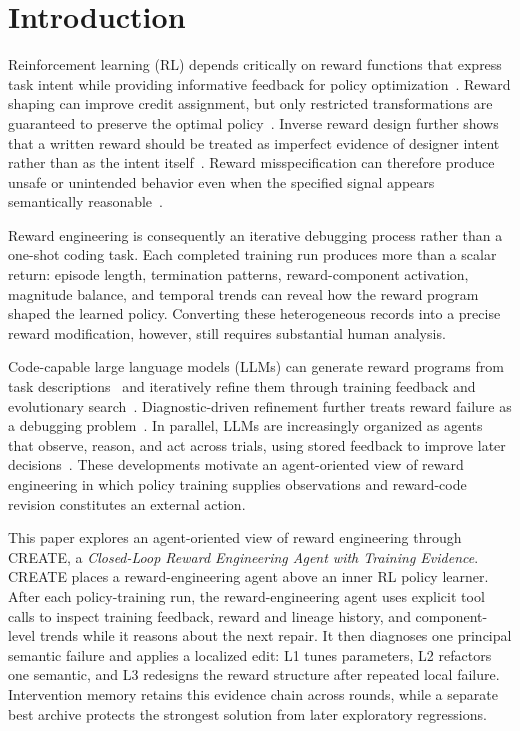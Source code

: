 \section{Introduction}

Reinforcement learning (RL) depends critically on reward functions that express task intent while providing informative feedback for policy optimization~\cite{sutton2018rl}. Reward shaping can improve credit assignment, but only restricted transformations are guaranteed to preserve the optimal policy~\cite{ng1999policy}. Inverse reward design further shows that a written reward should be treated as imperfect evidence of designer intent rather than as the intent itself~\cite{hadfield2017inverse}. Reward misspecification can therefore produce unsafe or unintended behavior even when the specified signal appears semantically reasonable~\cite{amodei2016concrete}.

Reward engineering is consequently an iterative debugging process rather than a one-shot coding task. Each completed training run produces more than a scalar return: episode length, termination patterns, reward-component activation, magnitude balance, and temporal trends can reveal how the reward program shaped the learned policy. Converting these heterogeneous records into a precise reward modification, however, still requires substantial human analysis.

Code-capable large language models (LLMs) can generate reward programs from task descriptions~\cite{language2rewards,text2reward} and iteratively refine them through training feedback and evolutionary search~\cite{eureka,card,revolve,cotreward}. Diagnostic-driven refinement further treats reward failure as a debugging problem~\cite{wang2026diagnostic}. In parallel, LLMs are increasingly organized as agents that observe, reason, and act across trials, using stored feedback to improve later decisions~\cite{react,reflexion,selfrefine}. These developments motivate an agent-oriented view of reward engineering in which policy training supplies observations and reward-code revision constitutes an external action.

This paper explores an agent-oriented view of reward engineering through CREATE, a \emph{Closed-Loop Reward Engineering Agent with Training Evidence}. CREATE places a reward-engineering agent above an inner RL policy learner. After each policy-training run, the reward-engineering agent uses explicit tool calls to inspect training feedback, reward and lineage history, and component-level trends while it reasons about the next repair. It then diagnoses one principal semantic failure and applies a localized edit: L1 tunes parameters, L2 refactors one semantic, and L3 redesigns the reward structure after repeated local failure. Intervention memory retains this evidence chain across rounds, while a separate best archive protects the strongest solution from later exploratory regressions.

